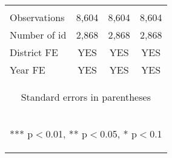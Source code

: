 \begin{center}
\begin{tabular}{lccc}
\vspace{4pt} & \begin{footnotesize}\end{footnotesize} & \begin{footnotesize}\end{footnotesize} & \begin{footnotesize}\end{footnotesize} \\
Observations & 8,604 & 8,604 & 8,604 \\
Number of id & 2,868 & 2,868 & 2,868 \\
District FE & YES & YES & YES \\
 Year FE & YES & YES & YES \\ \hline
\multicolumn{4}{c}{\begin{footnotesize} Standard errors in parentheses\end{footnotesize}} \\
\multicolumn{4}{c}{\begin{footnotesize} *** p$<$0.01, ** p$<$0.05, * p$<$0.1\end{footnotesize}} \\
\end{tabular}
\end{center}
